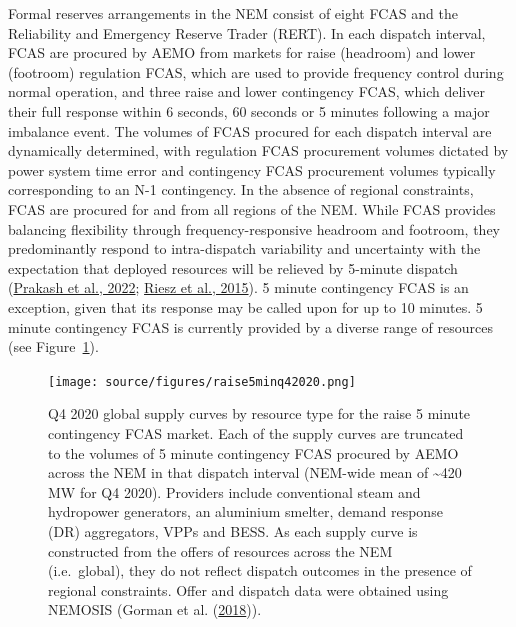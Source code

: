 \documentclass[12pt,a4paper,]{report}
\begin{document}
Formal reserves arrangements in the NEM consist of eight FCAS and the
Reliability and Emergency Reserve Trader (RERT). In each dispatch
interval, FCAS are procured by AEMO from markets for raise (headroom)
and lower (footroom) regulation FCAS, which are used to provide
frequency control during normal operation, and three raise and lower
contingency FCAS, which deliver their full response within 6 seconds, 60
seconds or 5 minutes following a major imbalance event. The volumes of
FCAS procured for each dispatch interval are dynamically determined,
with regulation FCAS procurement volumes dictated by power system time
error and contingency FCAS procurement volumes typically corresponding
to an N-1 contingency. In the absence of regional constraints, FCAS are
procured for and from all regions of the NEM. While FCAS provides
balancing flexibility through frequency-responsive headroom and
footroom, they predominantly respond to intra-dispatch variability and
uncertainty with the expectation that deployed resources will be
relieved by 5-minute dispatch
(\protect\hyperlink{ref-prakashInsightsDesigningEffective2022}{Prakash
et al., 2022};
\protect\hyperlink{ref-rieszFrequencyControlAncillary2015}{Riesz et al.,
2015}). 5 minute contingency FCAS is an exception, given that its
response may be called upon for up to 10 minutes. 5 minute contingency
FCAS is currently provided by a diverse range of resources (see
Figure~\ref{fig:raise_delayed_supply}).

\begin{figure}
\hypertarget{fig:raise_delayed_supply}{%
\centering
\texttt{[image: source/figures/raise5minq42020.png]}
\caption[Q4 2020 5-minute contingency FCAS global supply curve by
resource type]{Q4 2020 global supply curves by resource type for the
raise 5 minute contingency FCAS market. Each of the supply curves are
truncated to the volumes of 5 minute contingency FCAS procured by AEMO
across the NEM in that dispatch interval (NEM-wide mean of
\textasciitilde420 MW for Q4 2020). Providers include conventional steam
and hydropower generators, an aluminium smelter, demand response (DR)
aggregators, VPPs and BESS. As each supply curve is constructed from the
offers of resources across the NEM (i.e.~global), they do not reflect
dispatch outcomes in the presence of regional constraints. Offer and
dispatch data were obtained using NEMOSIS (Gorman et al.
(\protect\hyperlink{ref-gormanNEMOSISNEMOpen2018}{2018})).}\label{fig:raise_delayed_supply}
}
\end{figure}
\end{document}
